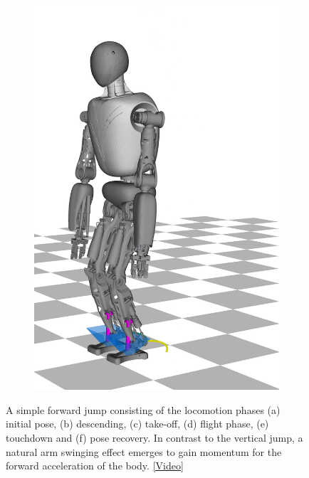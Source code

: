 \begin{figure}
\begin{subfigure}{.16\textwidth}
	\includegraphics[width=1\linewidth]{fig/jumpForward/snaps/6x}
	\caption{}
\end{subfigure}%
\caption[A simple forward jump]{A simple forward jump consisting of the locomotion phases (a) initial pose, (b) descending, (c) take-off, (d) flight phase, (e) touchdown and (f) pose recovery. In contrast to the vertical jump, a natural arm swinging effect emerges to gain momentum for the forward acceleration of the body. \href{https://github.com/julesser/ma-thesis-simulation-results/blob/master/Jump_Forward_NoJLim/crocoddyl.mp4}{[Video]}}
\label{fig:jumpForward_Snaps}
\end{figure} 


